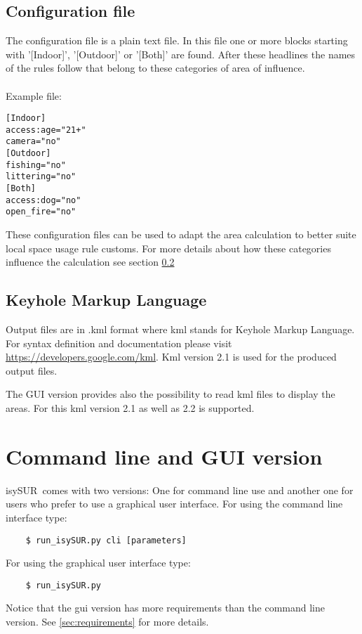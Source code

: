 \documentclass[11pt,fleqn]{book} %
\newcommand{\ProjectTitle}{isySUR}
\newcommand{\pt}{\ProjectTitle}
\begin{document}
\subsection{Configuration file}
The configuration file is a plain text file. In this file one or more blocks starting with '[Indoor]', '[Outdoor]' or '[Both]' are found. After these headlines the names of the rules follow that belong to these categories of area of influence.
\\~\\
Example file:
\begin{verbatim}
[Indoor]
access:age="21+"
camera="no"
[Outdoor]
fishing="no"
littering="no"
[Both]
access:dog="no"
open_fire="no"
\end{verbatim}

These configuration files can be used to adapt the area calculation to better suite local space usage rule customs. For more details about how these categories influence the calculation see section \ref{} %

\subsection{Keyhole Markup Language}
Output files are in .kml format where kml stands for Keyhole Markup Language. For syntax definition and documentation please visit \url{https://developers.google.com/kml}. Kml version 2.1 is used for the produced output files.

The GUI version provides also the possibility to read kml files to display the areas. For this kml version 2.1 as well as 2.2 is supported.

\section{Command line and GUI version}\label{sec:usage}
\pt\ comes with two versions: One for command line use and another one for users who prefer to use a graphical user interface.
For using the command line interface type:
\begin{verbatim}
	$ run_isySUR.py cli [parameters]
\end{verbatim}
For using the graphical user interface type:
\begin{verbatim}
	$ run_isySUR.py
\end{verbatim}

Notice that the gui version has more requirements than the command line version. See \ref{sec:requirements} for more details.
\end{document}

